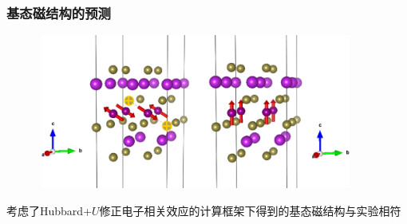 \documentclass[cjk,slidestop,compress,mathserif,blue]{beamer}
\begin{document}
\frame
{
	\frametitle{\textrm{}基态磁结构的预测}
\begin{figure}[h!]
\vspace*{-0.4in}
\centering
\includegraphics[height=2.00in,width=4.10in]{Figures/MagGene-MnBiTe.png}
\label{Fig:MnBiTe}
\end{figure}
\begin{minipage}[!t]{0.49\textwidth}
 \vspace*{-35pt}
{\fontsize{7.5pt}{6.0pt}}
\end{minipage}
\begin{minipage}[b]{0.49\textwidth}
 \vspace*{-5pt}
{\fontsize{7.5pt}{6.0pt}}
\end{minipage}
\vskip 5pt
考虑了\textrm{Hubbard}+$U$修正电子相关效应的计算框架下得到的基态磁结构与实验相符
}

\end{document}
